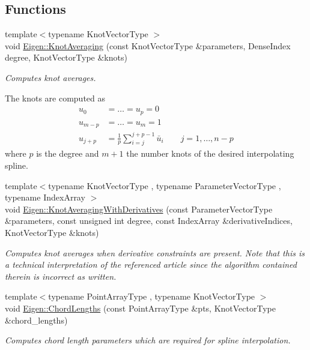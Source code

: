 \subsection*{Functions}
\begin{DoxyCompactItemize}
\item 
{\footnotesize template$<$typename Knot\+Vector\+Type $>$ }\\void \hyperlink{group___splines___module_ga9474da5ed68bbd9a6788a999330416d6}{Eigen\+::\+Knot\+Averaging} (const Knot\+Vector\+Type \&parameters, Dense\+Index degree, Knot\+Vector\+Type \&knots)
\begin{DoxyCompactList}\small\item\em Computes knot averages.

The knots are computed as \begin{align*} u_0 & = \hdots = u_p = 0 \\ u_{m-p} & = \hdots = u_{m} = 1 \\ u_{j+p} & = \frac{1}{p}\sum_{i=j}^{j+p-1}\bar{u}_i \quad\quad j=1,\hdots,n-p \end{align*} where $p$ is the degree and $m+1$ the number knots of the desired interpolating spline. \end{DoxyCompactList}\item 
{\footnotesize template$<$typename Knot\+Vector\+Type , typename Parameter\+Vector\+Type , typename Index\+Array $>$ }\\void \hyperlink{group___splines___module_gae10a6f9b6ab7fb400a2526b6382c533b}{Eigen\+::\+Knot\+Averaging\+With\+Derivatives} (const Parameter\+Vector\+Type \&parameters, const unsigned int degree, const Index\+Array \&derivative\+Indices, Knot\+Vector\+Type \&knots)
\begin{DoxyCompactList}\small\item\em Computes knot averages when derivative constraints are present. Note that this is a technical interpretation of the referenced article since the algorithm contained therein is incorrect as written. \end{DoxyCompactList}\item 
{\footnotesize template$<$typename Point\+Array\+Type , typename Knot\+Vector\+Type $>$ }\\void \hyperlink{group___splines___module_ga1b4cbde5d98411405871accf877552d2}{Eigen\+::\+Chord\+Lengths} (const Point\+Array\+Type \&pts, Knot\+Vector\+Type \&chord\+\_\+lengths)
\begin{DoxyCompactList}\small\item\em Computes chord length parameters which are required for spline interpolation. \end{DoxyCompactList}\end{DoxyCompactItemize}


